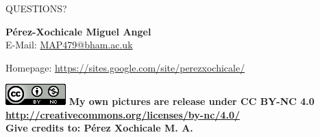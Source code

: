 \documentclass{beamer}
\theoremstyle{definition}
\begin{document}
\begin{frame}
\frametitle{}

\vspace{2cm}
\begin{center}
\LARGE{QUESTIONS?} 
\end{center}

\vspace{1cm}

\normalsize 
\textbf{P\'erez-Xochicale Miguel Angel} \\

E-Mail: {\color{blue} \href{mailto:MAP479@bham.ac.uk}{MAP479@bham.ac.uk} } 

Homepage:
{\color{blue} \href{https://sites.google.com/site/perezxochicale/}{https://sites.google.com/site/perezxochicale/} }
\vspace{1cm}


\includegraphics[scale=.4]{CC4}
\tiny{ 
\textbf{My own pictures are release under CC BY-NC 4.0
{\color{blue} \href{http://creativecommons.org/licenses/by-nc/4.0/}{http://creativecommons.org/licenses/by-nc/4.0/} } \\
Give credits to: P\'erez Xochicale M. A.
}
}







\end{frame}
\end{document}
